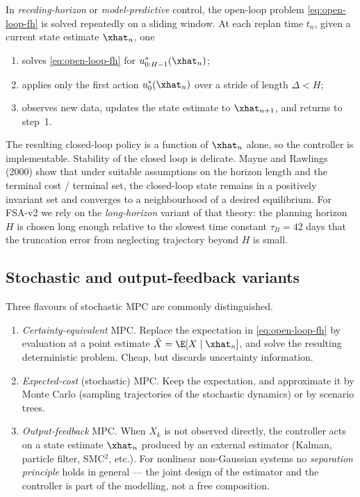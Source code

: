 In \emph{receding-horizon} or \emph{model-predictive} control, the
open-loop problem \eqref{eq:open-loop-fh} is solved repeatedly on a
sliding window. At each replan time $t_n$, given a current state
estimate $\xhat_n$, one
\begin{enumerate}
  \item solves \eqref{eq:open-loop-fh} for $u_{0:H-1}^*(\xhat_n)$;
  \item applies only the first action $u_0^*(\xhat_n)$ over a stride of
        length $\Delta < H$;
  \item observes new data, updates the state estimate to $\xhat_{n+1}$,
        and returns to step~1.
\end{enumerate}
The resulting closed-loop policy is a function of $\xhat_n$ alone, so the
controller is implementable. Stability of the closed loop is delicate.
Mayne and Rawlings (2000) show that under suitable assumptions on the
horizon length and the terminal cost / terminal set, the closed-loop
state remains in a positively invariant set and converges to a
neighbourhood of a desired equilibrium. For FSA-v2 we rely on the
\emph{long-horizon} variant of that theory: the planning horizon
$H$ is chosen long enough relative to the slowest time constant
$\tau_B = 42$ days that the truncation error from neglecting trajectory
beyond $H$ is small.

\subsection{Stochastic and output-feedback variants}\label{sec:mpc-variants}

Three flavours of stochastic MPC are commonly distinguished.

\begin{enumerate}
  \item[(i)] \emph{Certainty-equivalent} MPC. Replace the expectation in
        \eqref{eq:open-loop-fh} by evaluation at a point estimate
        $\hat X = \E[X\mid \xhat_n]$, and solve the resulting deterministic
        problem. Cheap, but discards uncertainty information.
  \item[(ii)] \emph{Expected-cost} (stochastic) MPC. Keep the
        expectation, and approximate it by Monte Carlo (sampling
        trajectories of the stochastic dynamics) or by scenario trees.
  \item[(iii)] \emph{Output-feedback} MPC. When $X_k$ is not observed
        directly, the controller acts on a state estimate $\xhat_n$
        produced by an external estimator (Kalman, particle filter,
        SMC${}^2$, etc.). For nonlinear non-Gaussian systems no
        \emph{separation principle} holds in general --- the joint
        design of the estimator and the controller is part of the
        modelling, not a free composition.
\end{enumerate}

